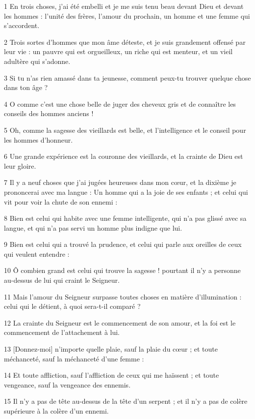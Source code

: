 
\par 1 En trois choses, j'ai été embelli et je me suis tenu beau devant Dieu et devant les hommes : l'unité des frères, l'amour du prochain, un homme et une femme qui s'accordent.
\par 2 Trois sortes d'hommes que mon âme déteste, et je suis grandement offensé par leur vie : un pauvre qui est orgueilleux, un riche qui est menteur, et un vieil adultère qui s'adonne.
\par 3 Si tu n'as rien amassé dans ta jeunesse, comment peux-tu trouver quelque chose dans ton âge ?
\par 4 O comme c'est une chose belle de juger des cheveux gris et de connaître les conseils des hommes anciens !
\par 5 Oh, comme la sagesse des vieillards est belle, et l'intelligence et le conseil pour les hommes d'honneur.
\par 6 Une grande expérience est la couronne des vieillards, et la crainte de Dieu est leur gloire.
\par 7 Il y a neuf choses que j'ai jugées heureuses dans mon cœur, et la dixième je prononcerai avec ma langue : Un homme qui a la joie de ses enfants ; et celui qui vit pour voir la chute de son ennemi :
\par 8 Bien est celui qui habite avec une femme intelligente, qui n'a pas glissé avec sa langue, et qui n'a pas servi un homme plus indigne que lui.
\par 9 Bien est celui qui a trouvé la prudence, et celui qui parle aux oreilles de ceux qui veulent entendre :
\par 10 Ô combien grand est celui qui trouve la sagesse ! pourtant il n'y a personne au-dessus de lui qui craint le Seigneur.
\par 11 Mais l'amour du Seigneur surpasse toutes choses en matière d'illumination : celui qui le détient, à quoi sera-t-il comparé ?
\par 12 La crainte du Seigneur est le commencement de son amour, et la foi est le commencement de l'attachement à lui.
\par 13 [Donnez-moi] n'importe quelle plaie, sauf la plaie du cœur ; et toute méchanceté, sauf la méchanceté d'une femme :
\par 14 Et toute affliction, sauf l'affliction de ceux qui me haïssent ; et toute vengeance, sauf la vengeance des ennemis.
\par 15 Il n'y a pas de tête au-dessus de la tête d'un serpent ; et il n’y a pas de colère supérieure à la colère d’un ennemi.
